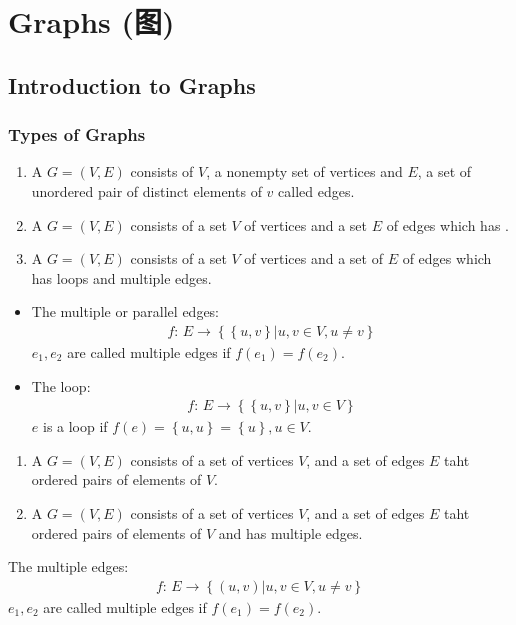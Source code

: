 \section[Graphs]{Graphs (图)}

\subsection{Introduction to Graphs}

\subsubsection{Types of Graphs}
\begin{definition}
    \begin{enumerate}
        \item A  $G=(V,E)$ consists of $V$, a nonempty set of vertices and $E$, a set of unordered pair of distinct elements of $v$ called edges. 
        \item A  $G=(V,E)$ consists of a set $V$ of vertices and a set $E$ of edges which has . 
        \item A  $G=(V,E)$ consists of a set $V$ of vertices and a set of $E$ of edges which has loops and multiple edges. 
    \end{enumerate}
    \begin{itemize}
        \item The multiple or parallel edges: 
        \begin{align*}
            f:\, E\rightarrow \left\{ \left\{u,v\right\}|u,v\in V,u\ne v \right\}
        \end{align*}
        $e_1,e_2$ are called multiple edges if $f(e_1)=f(e_2)$. 
        \item The loop: 
        \begin{align*}
            f:\, E\rightarrow \left\{ \left\{u,v\right\}|u,v\in V \right\}
        \end{align*}
        $e$ is a loop if $f(e)=\left\{u,u\right\}=\left\{u\right\}, u\in V$.
    \end{itemize}
\end{definition}

\begin{definition}
    \begin{enumerate}
        \item A  $G=(V,E)$ consists of a set of vertices $V$, and a set of edges $E$ taht ordered pairs of elements of $V$.
        \item A  $G=(V,E)$ consists of a set of vertices $V$, and a set of edges $E$ taht ordered pairs of elements of $V$ and has multiple edges.
    \end{enumerate}

    The multiple edges: 
    \begin{align*}
        f:\,E\rightarrow \left\{ (u,v)| u,v\in V,u\ne v \right\}
    \end{align*}
    $e_1,e_2$ are called multiple edges if $f(e_1)=f(e_2)$.
\end{definition}


